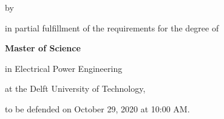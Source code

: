 \begin{titlepage}

\begin{center}


\vspace*{2\bigskipamount}

{\makeatletter
\titlestyle\color{tudelft-cyan}\Huge\@title
\makeatother}

{\makeatletter
\ifx\@subtitle\undefined\else
    \bigskip
    \titlefont\titleshape\LARGE\@subtitle
\fi
\makeatother}

\bigskip
\bigskip

by

\bigskip
\bigskip

{\makeatletter
\titlefont\Large\bfseries\@author
\makeatother}

\vfill

in partial fulfillment of the requirements for the degree of

\bigskip
\bigskip

{\bfseries Master of Science}

in Electrical Power Engineering

\bigskip
\bigskip

at the Delft University of Technology,

to be defended on October 29, 2020 at 10:00 AM.

\vspace{25mm}


\end{center}
\end{titlepage}
